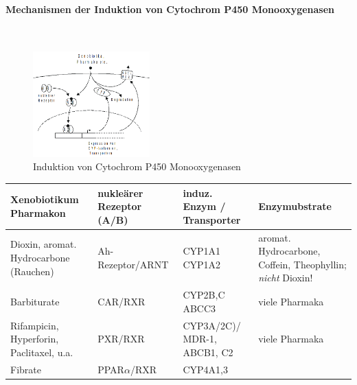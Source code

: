 \documentclass[10pt,a4paper]{report}
\begin{document}
\paragraph{Mechanismen der Induktion von Cytochrom P450 Monooxygenasen} \mbox{}\\
\begin{figure}[h]
	\centering 
	\includegraphics[width=0.4\textwidth]{CYP2.png} 
	\caption{Induktion von Cytochrom P450 Monooxygenasen} 
	\label{fig:Cytochrom2}
\end{figure}
\begin{tabularx}{\textwidth}{XXXX}
Xenobiotikum Pharmakon& nukleärer Rezeptor (A/B)&induz. Enzym / Transporter&Enzymubstrate\\\hline
Dioxin, aromat. Hydrocarbone (Rauchen)& Ah-Rezeptor/ARNT&CYP1A1 CYP1A2&aromat. Hydrocarbone, Coffein, Theophyllin; \textit{nicht} Dioxin!\\
Barbiturate&CAR/RXR&CYP2B,C ABCC3&viele Pharmaka\\
Rifampicin, Hyperforin, Paclitaxel, u.a.&PXR/RXR&CYP3A/2C)/ MDR-1, ABCB1, C2&viele Pharmaka\\
Fibrate&PPAR$\alpha$/RXR&CYP4A1,3&\\
\end{tabularx}
\end{document}
